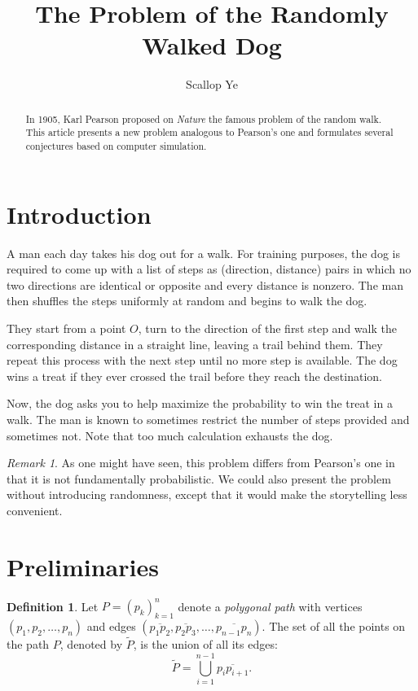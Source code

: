 \documentclass{amsart}
\title{The Problem of the Randomly Walked Dog}
\author{Scallop Ye}
\theoremstyle{definition}
\newtheorem{definition}[theorem]{Definition}
\theoremstyle{remark}
\newtheorem*{remark}{Remark}
\begin{document}
\begin{abstract}
    In 1905, Karl Pearson \cite{pearson} proposed on \emph{Nature} the
    famous problem of the random walk. This article presents a
    new problem analogous to Pearson's one and formulates several
    conjectures based on computer simulation.
\end{abstract}

\maketitle

\section{Introduction}

A man each day takes his dog out for a walk. For training purposes,
the dog is required to come up with a list of steps as (direction, distance) pairs
in which no two directions are identical or opposite and every distance is nonzero.
The man then shuffles the steps uniformly at random and begins to walk the dog.

They start from a point $O$, turn to the direction of the first step and walk the
corresponding distance in a straight line, leaving a trail behind them.
They repeat this process with the next step until no more step is available.
The dog wins a treat if they ever crossed the trail before they reach the destination.

Now, the dog asks you to help maximize the probability to win the treat in a walk.
The man is known to sometimes restrict the number of steps provided and sometimes not.
Note that too much calculation exhausts the dog.

\begin{remark}
    As one might have seen, this problem differs from Pearson's one in that
    it is not fundamentally probabilistic. We could also present the problem
    without introducing randomness, except that it would make the storytelling less convenient.
\end{remark}

\section{Preliminaries}

\begin{definition}
    Let $P=(p_k)_{k=1}^n$ denote a \emph{polygonal path} with vertices\\
    $(p_1,p_2,\dots,p_n)$ and edges
    $(\overline{p_1p_2},\overline{p_2p_3},\dots,\overline{p_{n-1}p_n})$.
    The set of all the points on the path $P$, denoted by $\widetilde{P}$,
    is the union of all its edges:
    \[\widetilde{P}=\bigcup_{i=1}^{n-1}\overline{p_{i}p_{i+1}}.\]
\end{definition}
\end{document}
